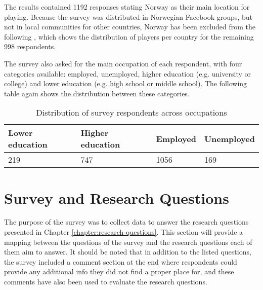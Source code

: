 
The results contained 1192 responses stating Norway as their main location for playing. Because the survey was distributed in Norwegian Facebook groups, but not in local communities for other countries, Norway has been excluded from the following , which shows the distribution of players per country for the remaining 998 respondents.


The survey also asked for the main occupation of each respondent, with four categories available: employed, unemployed, higher education (e.g. university or college) and lower education (e.g. high school or middle school). The following table again shows the distribution between these categories. 

\begin{table}[h]
	\centering
	\caption{Distribution of survey respondents across occupations}
	\label{tbl:survey-occupation-distribution}
	\begin{tabularx}{\textwidth}{|l|l|X|X|}
		\hline
		\textbf{Lower education} & \textbf{Higher education} & \textbf{Employed} & \textbf{Unemployed}\\
		\hline\hline
		
		219 & 747 & 1056 & 169\\
		\hline
	\end{tabularx}
\end{table}

\section{Survey and Research Questions}

The purpose of the survey was to collect data to answer the research questions presented in Chapter \ref{chapter:research-questions}. This section will provide a mapping between the questions of the survey and the research questions each of them aim to answer. It should be noted that in addition to the listed questions, the survey included a comment section at the end where respondents could provide any additional info they did not find a proper place for, and these comments have also been used to evaluate the research questions.

